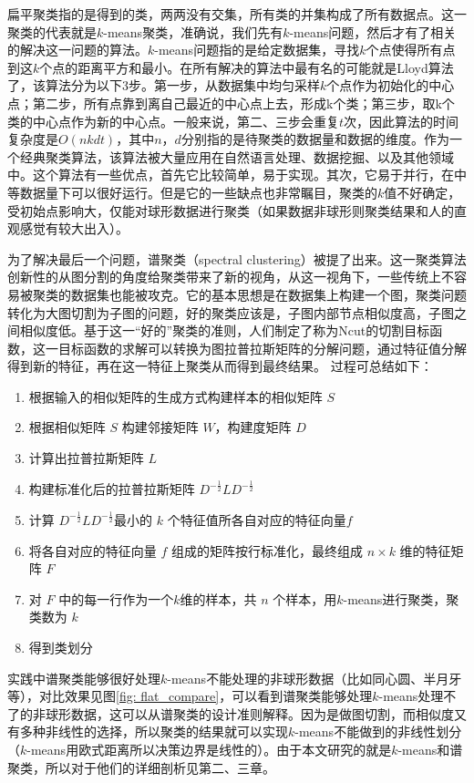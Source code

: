 扁平聚类指的是得到的类，两两没有交集，所有类的并集构成了所有数据点。这一聚类的代表就是$k$-means聚类，准确说，我们先有$k$-means问题，然后才有了相关的解决这一问题的算法。$k$-means问题指的是给定数据集，寻找$k$个点使得所有点到这$k$个点的距离平方和最小。在所有解决的算法中最有名的可能就是Lloyd算法了，该算法分为以下3步。第一步，从数据集中均匀采样$k$个点作为初始化的中心点；第二步，所有点靠到离自己最近的中心点上去，形成k个类；第三步，取k个类的中心点作为新的中心点。一般来说，第二、三步会重复$t$次，因此算法的时间复杂度是$O(nkdt)$，其中$n$，$d$分别指的是待聚类的数据量和数据的维度。作为一个经典聚类算法，该算法被大量应用在自然语言处理、数据挖掘、以及其他领域中。这个算法有一些优点，首先它比较简单，易于实现。其次，它易于并行，在中等数据量下可以很好运行。但是它的一些缺点也非常瞩目，聚类的$k$值不好确定，受初始点影响大，仅能对球形数据进行聚类（如果数据非球形则聚类结果和人的直观感觉有较大出入）。

为了解决最后一个问题，谱聚类（spectral clustering）被提了出来。这一聚类算法创新性的从图分割的角度给聚类带来了新的视角，从这一视角下，一些传统上不容易被聚类的数据集也能被攻克。它的基本思想是在数据集上构建一个图，聚类问题转化为大图切割为子图的问题，好的聚类应该是，子图内部节点相似度高，子图之间相似度低。基于这一“好的”聚类的准则，人们制定了称为Ncut的切割目标函数，这一目标函数的求解可以转换为图拉普拉斯矩阵的分解问题，通过特征值分解得到新的特征，再在这一特征上聚类从而得到最终结果。
过程可总结如下：
\begin{enumerate}
    \item 根据输入的相似矩阵的生成方式构建样本的相似矩阵 $S$
    \item 根据相似矩阵 $S$ 构建邻接矩阵 $W$，构建度矩阵 $D$
    \item 计算出拉普拉斯矩阵 $L$
    \item 构建标准化后的拉普拉斯矩阵 $D^{- \frac{1}{2}}L D^{- \frac{1}{2}}$
    \item 计算 $D^{- \frac{1}{2}}L D^{- \frac{1}{2}}$最小的 $k$ 个特征值所各自对应的特征向量$f$
    \item 将各自对应的特征向量 $f$ 组成的矩阵按行标准化，最终组成 $n\times k$ 维的特征矩阵 $F$
    \item 对 $F$ 中的每一行作为一个$k$维的样本，共 $n$ 个样本，用$k$-means进行聚类，聚类数为 $k$
    \item 得到类划分
\end{enumerate}
实践中谱聚类能够很好处理$k$-means不能处理的非球形数据（比如同心圆、半月牙等），对比效果见图\ref{fig: flat_compare}，可以看到谱聚类能够处理$k$-means处理不了的非球形数据，这可以从谱聚类的设计准则解释。因为是做图切割，而相似度又有多种非线性的选择，所以聚类的结果就可以实现$k$-means不能做到的非线性划分（$k$-means用欧式距离所以决策边界是线性的）。由于本文研究的就是$k$-means和谱聚类，所以对于他们的详细剖析见第二、三章。

